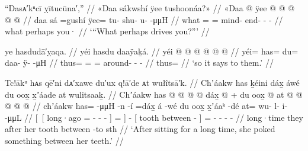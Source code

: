 \ex\label{ex:92-73-what-maybe-drove-you}%
%
\begingl
	\glpreamble	“Dasᴀ′kᵘcī ỵītucūna′,” //
	\glpreamble	«\!Daa sákwshí ÿee tushoonáa?\!» //
	\gla	«\!Daa  @ {}
		ÿee @  @ {} @ {} @ {} @ {} //
	\glb	\pqp{}daa sá =gushí
		ÿee= tu- shu- u-  -μμH //
	\glc	\pqp{}what  =
		= mind- end- -  - //
	\gld	\pqp{}what  \•perhaps
		you·  {} {} {} {} //
	\glft	‘“What perhaps drives you?”’
		//
\endgl
\xe


\ex\label{ex:92-74-so-says-to-them}%
%
\begingl
	\glpreamble	ye hasdudā′ỵaqa. //
	\glpreamble	yéi hasdu daaÿaḵá. //
	\gla	yéi @  @ {} @  @ {} @ {} @ {} //
	\glb	yéi= has= du= daa- ÿ-  -μH //
	\glc	thus= = = around- -  - //
	\gld	thus=  {}  {} {} {} //
	\glft	‘so it says to them.’
		//
\endgl
\xe


\ex\label{ex:92-75-poke-sth-between-teeth}%
%
\begingl
	\glpreamble	Tc!ākᵘ hᴀs qē′ni dᴀ′xawe du′ux q!ā′de ᴀt wułîtsā′k. //
	\glpreamble	Chʼáakw has ḵéini dáx̱ áwé du oox̱ x̱ʼáade at wulitsaaḵ. //
	\gla	{} Chʼáakw has @  @ {} @ {} @ {} {} \•dáx̱ {}  @ {} +
		{} du oox̱  @ {} {}
		at @  @ {} @ {} @ {} @ {} //
	\glb	{} chʼáakw has=  -μμH -n -í {} =dáx̱ {} á -wé
		{} du oox̱ x̱ʼáaᵏ -dé {}
		at= wu- l- i-  -μμL //
	\glc	{}[~[ long·ago =  -
			- - {}] = {}]  -
		{}[  tooth between - {}]
		= - - -  - //
	\gld	{} long·time they  {} {} {} {}
			\•after {}  {}
		{} her tooth between -to {}
		sth  {} {} {} {} //
	\glft	‘After sitting for a long time, she poked something between her teeth.’
		//
\endgl
\xe


